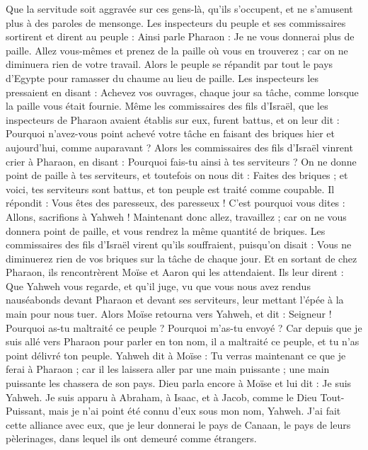 \begin{multicols}{2}
Que la servitude soit aggravée sur ces gens-là, qu'ils s'occupent, et ne s'amusent plus à des paroles de mensonge.
Les inspecteurs du peuple et ses commissaires sortirent et dirent au peuple : Ainsi parle Pharaon : Je ne vous donnerai plus de paille.
Allez vous-mêmes et prenez de la paille où vous en trouverez ; car on ne diminuera rien de votre travail.
Alors le peuple se répandit par tout le pays d'Egypte pour ramasser du chaume au lieu de paille.
Les inspecteurs les pressaient en disant : Achevez vos ouvrages, chaque jour sa tâche, comme lorsque la paille vous était fournie.
Même les commissaires des fils d'Israël, que les inspecteurs de Pharaon avaient établis sur eux, furent battus, et on leur dit : Pourquoi n'avez-vous point achevé votre tâche en faisant des briques hier et aujourd'hui, comme auparavant ?
Alors les commissaires des fils d'Israël vinrent crier à Pharaon, en disant : Pourquoi fais-tu ainsi à tes serviteurs ?
On ne donne point de paille à tes serviteurs, et toutefois on nous dit : Faites des briques ; et voici, tes serviteurs sont battus, et ton peuple est traité comme coupable.
Il répondit : Vous êtes des paresseux, des paresseux ! C'est pourquoi vous dites : Allons, sacrifions à Yahweh !
Maintenant donc allez, travaillez ; car on ne vous donnera point de paille, et vous rendrez la même quantité de briques.
Les commissaires des fils d'Israël virent qu'ils souffraient, puisqu'on disait : Vous ne diminuerez rien de vos briques sur la tâche de chaque jour.
Et en sortant de chez Pharaon, ils rencontrèrent Moïse et Aaron qui les attendaient.
Ils leur dirent : Que Yahweh vous regarde, et qu’il juge, vu que vous nous avez rendus nauséabonds devant Pharaon et devant ses serviteurs, leur mettant l'épée à la main pour nous tuer.
Alors Moïse retourna vers Yahweh, et dit : Seigneur ! Pourquoi as-tu maltraité ce peuple ? Pourquoi m'as-tu envoyé ?
Car depuis que je suis allé vers Pharaon pour parler en ton nom, il a maltraité ce peuple, et tu n'as point délivré ton peuple.
\VerseOne{}Yahweh dit à Moïse : Tu verras maintenant ce que je ferai à Pharaon ; car il les laissera aller par une main puissante ; une main puissante les chassera de son pays.
Dieu parla encore à Moïse et lui dit : Je suis Yahweh.
Je suis apparu à Abraham, à Isaac, et à Jacob, comme le Dieu Tout-Puissant, mais je n'ai point été connu d'eux sous mon nom, Yahweh.
J'ai fait cette alliance avec eux, que je leur donnerai le pays de Canaan, le pays de leurs pèlerinages, dans lequel ils ont demeuré comme étrangers.

\end{multicols}
